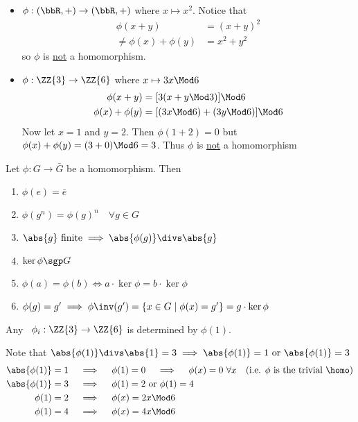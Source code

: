   \begin{nonexamples}
  \begin{itemize}
      \item \(\phi:(\bbR,+)\to (\bbR,+)\) where \(x\mapsto x^2\). Notice that
      \begin{align*}
          \phi(x+y)&=(x+y)^2 \\
          \neq \phi(x)+\phi(y) &= x^2+y^2
      \end{align*} so \(\phi\) is \uline{not} a homomorphism.

      \item \(\phi:\ZZ{3}\to\ZZ{6}\) where \(x\mapsto 3x\Mod 6\)
      \begin{align*}
          \phi(x+y) &= [3(x+y\Mod 3)]\Mod 6 \\
          \phi(x)+\phi(y) &= [(3x\Mod 6) + (3y\Mod 6)]\Mod 6
      \end{align*}
      Now let \(x=1\) and \(y=2\). Then \(\phi(1+2)=0\) but \(\phi(x)+\phi(y)=(3+0)\Mod 6 = 3\). Thus \(\phi\) is \uline{not} a homomorphism
  \end{itemize}
  \end{nonexamples}

  \begin{theorem}
      Let \(\phi: G\to\bar G\) be a homomorphism. Then
      \begin{enumerate}
          \item \(\phi(e)=\bar e\)
          \item \(\phi(g^n)=\phi(g)^n\quad \forall g\in G\)
          \item \(\abs{g}\text{ finite} \implies \abs{\phi(g)} \divs \abs{g}\)
          \item \(\ker\phi \sgp G\)
          \item \(\phi(a) = \phi(b) \iff a\cdot\ker\phi = b\cdot\ker\phi\)
          \item \(\phi(g)=g'\implies \phi\inv(g')=\{x\in G \mid\phi(x)=g'\} = g\cdot \ker\phi\)
      \end{enumerate}
  \end{theorem}

  \begin{example}
      Any \homo\ \(\phi_i: \ZZ{3}\to\ZZ{6}\) is determined by \(\phi(1)\).

      Note that \(\abs{\phi (1)} \divs \abs{1} = 3 \implies \abs{\phi (1)}=1 \text{ or } \abs{\phi (1)}=3\)
      \begin{align*}
          \abs{\phi(1)} = 1 \quad &\implies \quad \phi(1)=0 \quad \implies \quad \phi(x)=0\ \forall x \quad \text{(i.e. \(\phi\) is the trivial \homo)} \\
          \abs{\phi(1)} = 3 \quad &\implies \quad \phi(1)=2 \text{ or } \phi(1)=4 \\
          \phi(1) = 2 \quad &\implies \quad \phi(x)=2x \Mod 6 \\
          \phi(1) = 4 \quad &\implies \quad \phi(x)=4x \Mod 6
      \end{align*}
  \end{example}

